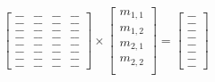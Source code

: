 \documentclass{csci1430}
\begin{document}
\begin{answer}
\begin{align*}
    \begin{bmatrix} 
    \_\_ & \_\_ & \_\_ & \_\_ \\ 
    \_\_ & \_\_ & \_\_ & \_\_ \\ 
    \_\_ & \_\_ & \_\_ & \_\_ \\ 
    \_\_ & \_\_ & \_\_ & \_\_ \\ 
    \_\_ & \_\_ & \_\_ & \_\_ \\ 
    \_\_ & \_\_ & \_\_ & \_\_ \\ 
    \_\_ & \_\_ & \_\_ & \_\_ \\ 
    \_\_ & \_\_ & \_\_ & \_\_
    \end{bmatrix} 
    \times \begin{bmatrix} m_{1,1} \\ m_{1,2} \\ m_{2,1} \\ m_{2,2} \\ \end{bmatrix} 
    = \begin{bmatrix} 
    \_\_ \\ 
    \_\_ \\ 
    \_\_ \\ 
    \_\_ \\ 
    \_\_ \\ 
    \_\_ \\ 
    \_\_ \\ 
    \_\_ 
    \end{bmatrix}
\end{align*}
\end{answer}
\end{document}
